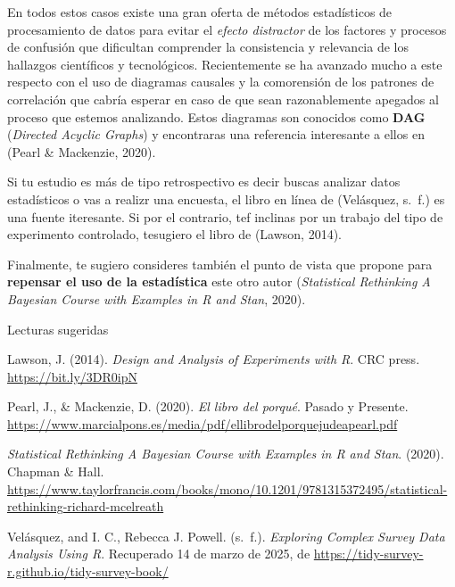 \documentclass[
  letterpaper,
  DIV=11,
  numbers=noendperiod]{scrartcl}
\newlength{\cslhangindent}
\newenvironment{CSLReferences}[2] %
 {\begin{list}{}{%
  \setlength{\itemindent}{0pt}
  \setlength{\leftmargin}{0pt}
  \setlength{\parsep}{0pt}
  \ifodd #1
   \setlength{\leftmargin}{\cslhangindent}
   \setlength{\itemindent}{-1\cslhangindent}
  \fi
  \setlength{\itemsep}{#2\baselineskip}}}
 {\end{list}}
\begin{document}
En todos estos casos existe una gran oferta de métodos estadísticos de
procesamiento de datos para evitar el \emph{efecto distractor} de los
factores y procesos de confusión que dificultan comprender la
consistencia y relevancia de los hallazgos científicos y tecnológicos.
Recientemente se ha avanzado mucho a este respecto con el uso de
diagramas causales y la comorensión de los patrones de correlación que
cabría esperar en caso de que sean razonablemente apegados al proceso
que estemos analizando. Estos diagramas son conocidos como \textbf{DAG}
(\emph{Directed Acyclic Graphs}) y encontraras una referencia
interesante a ellos en (Pearl \& Mackenzie, 2020).

Si tu estudio es más de tipo retrospectivo es decir buscas analizar
datos estadísticos o vas a realizr una encuesta, el libro en línea de
(Velásquez, s.~f.) es una fuente iteresante. Si por el contrario, tef
inclinas por un trabajo del tipo de experimento controlado, tesugiero el
libro de (Lawson, 2014).

Finalmente, te sugiero consideres también el punto de vista que propone
para \textbf{repensar el uso de la estadística} este otro autor
(\emph{Statistical {Rethinking} {\textbar} {A} {Bayesian} {Course} with
{Examples} in {R} and {Stan}}, 2020).

\label{refs}
\begin{CSLReferences}{1}{0}
Lecturas sugeridas

Lawson, J. (2014). \emph{Design and {Analysis} of {Experiments} with
{R}}. CRC press. \url{https://bit.ly/3DR0ipN}

Pearl, J., \& Mackenzie, D. (2020). \emph{El libro del porqué}. Pasado y
Presente.
\url{https://www.marcialpons.es/media/pdf/ellibrodelporquejudeapearl.pdf}

\emph{Statistical {Rethinking} {\textbar} {A} {Bayesian} {Course} with
{Examples} in {R} and {Stan}}. (2020). Chapman \& Hall.
\url{https://www.taylorfrancis.com/books/mono/10.1201/9781315372495/statistical-rethinking-richard-mcelreath}

Velásquez, and I. C., Rebecca J. Powell. (s.~f.). \emph{Exploring
{Complex} {Survey} {Data} {Analysis} {Using} {R}}. Recuperado 14 de
marzo de 2025, de
\url{https://tidy-survey-r.github.io/tidy-survey-book/}

\end{CSLReferences}
\end{document}
